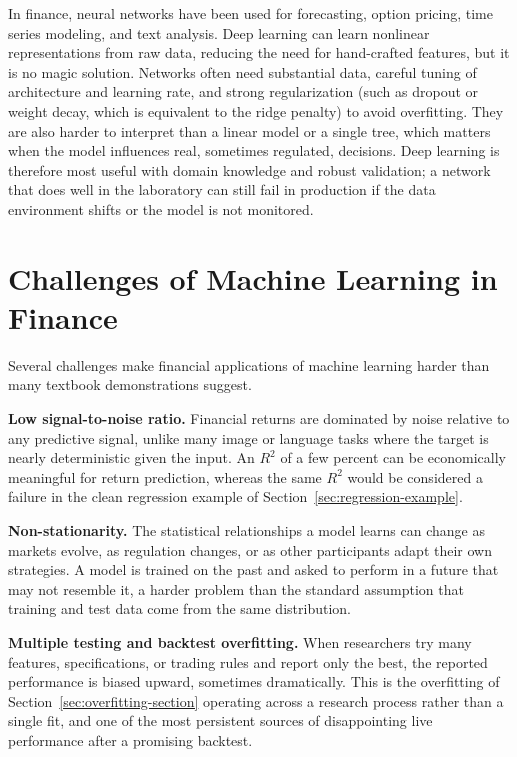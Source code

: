 \documentclass[../ai_in_finance]{subfiles}
\begin{document}
In finance, neural networks have been used for forecasting, option pricing, time series modeling, and text analysis. Deep learning can learn nonlinear representations from raw data, reducing the need for hand-crafted features, but it is no magic solution. Networks often need substantial data, careful tuning of architecture and learning rate, and strong regularization (such as dropout or weight decay, which is equivalent to the ridge penalty) to avoid overfitting. They are also harder to interpret than a linear model or a single tree, which matters when the model influences real, sometimes regulated, decisions. Deep learning is therefore most useful with domain knowledge and robust validation; a network that does well in the laboratory can still fail in production if the data environment shifts or the model is not monitored.

\section{Challenges of Machine Learning in Finance}
\label{sec:ml-challenges}

Several challenges make financial applications of machine learning harder than many textbook demonstrations suggest.

\textbf{Low signal-to-noise ratio.} Financial returns are dominated by noise relative to any predictive signal, unlike many image or language tasks where the target is nearly deterministic given the input. An $R^2$ of a few percent can be economically meaningful for return prediction, whereas the same $R^2$ would be considered a failure in the clean regression example of Section~\ref{sec:regression-example}.

\textbf{Non-stationarity.} The statistical relationships a model learns can change as markets evolve, as regulation changes, or as other participants adapt their own strategies. A model is trained on the past and asked to perform in a future that may not resemble it, a harder problem than the standard assumption that training and test data come from the same distribution.

\textbf{Multiple testing and backtest overfitting.} When researchers try many features, specifications, or trading rules and report only the best, the reported performance is biased upward, sometimes dramatically. This is the overfitting of Section~\ref{sec:overfitting-section} operating across a research process rather than a single fit, and one of the most persistent sources of disappointing live performance after a promising backtest.
\end{document}
